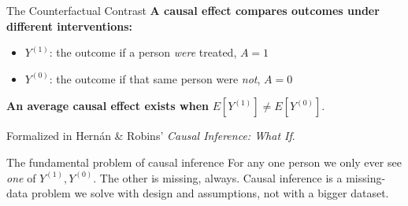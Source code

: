\documentclass[aspectratio=169]{beamer}
\begin{document}
\begin{frame}{The Counterfactual Contrast}
  \small
  \textbf{A causal effect compares outcomes under different interventions:}
  \begin{itemize}
    \item $Y^{(1)}$: the outcome if a person \emph{were} treated, $A=1$
    \item $Y^{(0)}$: the outcome if that same person were \emph{not}, $A=0$
  \end{itemize}
  \vspace{0.5em}

  \textbf{An average causal effect exists when} \quad $E[Y^{(1)}] \neq E[Y^{(0)}]$.
  \vspace{0.5em}

  Formalized in Hern{\'a}n \& Robins' \cite{hernan2020causal} \emph{Causal Inference: What If}.
  \vspace{0.8em}

  \begin{block}{The fundamental problem of causal inference}
    For any one person we only ever see \emph{one} of $Y^{(1)}, Y^{(0)}$.
    The other is missing, always. Causal inference is a missing-data problem
    we solve with design and assumptions, not with a bigger dataset.
  \end{block}
\end{frame}
\end{document}
